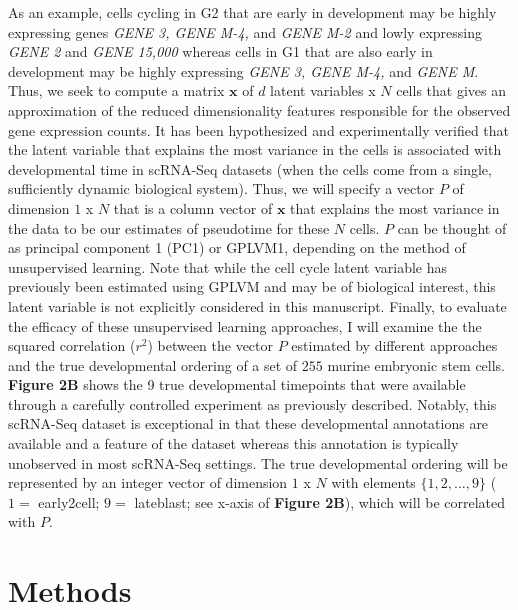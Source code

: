 \documentclass[english, 11pt]{article}\usepackage[]{graphicx}\usepackage[]{color}
\begin{document}
\noindent As an example, cells cycling in G2 that are early in development may be highly expressing genes \textit{GENE 3, GENE M-4,} and \textit{ GENE M-2} and lowly expressing \textit{GENE 2} and \textit{GENE 15,000} whereas cells in G1 that are also early in development may be highly expressing \textit{GENE 3, GENE M-4,} and \textit{GENE M}. Thus, we seek to compute a matrix $\mathbf{x}$ of $d$ latent variables x $N$ cells that gives an approximation of the reduced dimensionality features responsible for the observed gene expression counts. It has been hypothesized \cite{cannoodt2016computational} and experimentally verified \cite{lonnberg2017single} that the latent variable that explains the most variance in the cells is associated with developmental time in scRNA-Seq datasets (when the cells come from a single, sufficiently dynamic biological system). Thus, we will specify a vector $P$ of dimension $1$ x $N$ that is a column vector of $\mathbf{x}$ that explains the most variance in the data to be our estimates of pseudotime for these $N$ cells. $P$ can be thought of as principal component 1 (PC1) or GPLVM1, depending on the method of unsupervised learning. Note that while the cell cycle latent variable has previously been estimated using GPLVM \cite{buettner2015computational} and may be of biological interest, this latent variable is not explicitly considered in this manuscript.  \newline\newline
Finally, to evaluate the efficacy of these unsupervised learning approaches, I will examine the the squared correlation ($r^2$) between the vector $P$ estimated by different approaches and the true developmental ordering of a set of $255$ murine embryonic stem cells. \textbf{Figure 2B} shows the 9 true developmental timepoints that were available through a carefully controlled experiment as previously described. \cite{deng2014single} Notably, this scRNA-Seq dataset is exceptional in that these developmental annotations are available and a feature of the dataset whereas this annotation is typically unobserved in most scRNA-Seq settings. The true developmental ordering will be represented by an integer vector of dimension $1$ x $N$ with elements $\{ 1, 2, ..., 9\}$ ($1 = $ early2cell; $9 =$ lateblast; see x-axis of \textbf{Figure 2B}), which will be correlated with $P$. 


\section{Methods}
\end{document}
